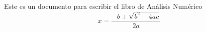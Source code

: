 \documentclass[12pt, letterpaper]{article}
\begin{document}
Este es un documento para escribir el libro de Análisis Numérico
\[
x=\frac{-b\pm\sqrt{b^2-4ac}}{2a}    
\]
\end{document}
